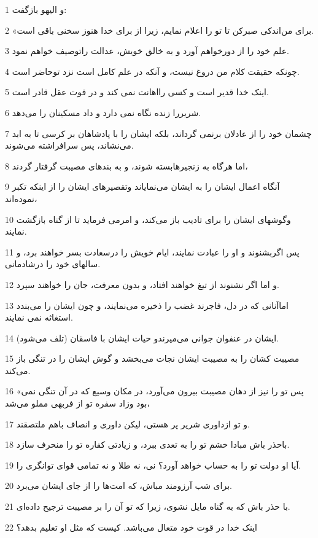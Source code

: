 \par 1 و الیهو باز‌گفت:
\par 2 «برای من‌اندکی صبرکن تا تو را اعلام نمایم، زیرا از برای خدا هنوز سخنی باقی است.
\par 3 علم خود را از دورخواهم آورد و به خالق خویش، عدالت راتوصیف خواهم نمود.
\par 4 چونکه حقیقت کلام من دروغ نیست، و آنکه در علم کامل است نزد توحاضر است.
\par 5 اینک خدا قدیر است و کسی رااهانت نمی کند و در قوت عقل قادر است.
\par 6 شریررا زنده نگاه نمی دارد و داد مسکینان را می‌دهد.
\par 7 چشمان خود را از عادلان برنمی گرداند، بلکه ایشان را با پادشاهان بر کرسی تا به ابد می‌نشاند، پس سرافراشته می‌شوند.
\par 8 اما هرگاه به زنجیرهابسته شوند، و به بندهای مصیبت گرفتار گردند،
\par 9 آنگاه اعمال ایشان را به ایشان می‌نمایاند وتقصیرهای ایشان را از اینکه تکبر نموده‌اند،
\par 10 وگوشهای ایشان را برای تادیب باز می‌کند، و امرمی فرماید تا از گناه بازگشت نمایند.
\par 11 پس اگربشنوند و او را عبادت نمایند، ایام خویش را درسعادت بسر خواهند برد، و سالهای خود را درشادمانی.
\par 12 و اما اگر نشنوند از تیغ خواهند افتاد، و بدون معرفت، جان را خواهند سپرد.
\par 13 اماآنانی که در دل، فاجرند غضب را ذخیره می‌نمایند، و چون ایشان را می‌بندد استغاثه نمی نمایند.
\par 14 ایشان در عنفوان جوانی می‌میرندو حیات ایشان با فاسقان (تلف می‌شود).
\par 15 مصیبت کشان را به مصیبت ایشان نجات می‌بخشد و گوش ایشان را در تنگی باز می‌کند.
\par 16 «پس تو را نیز از دهان مصیبت بیرون می‌آورد، در مکان وسیع که در آن تنگی نمی بود وزاد سفره تو از فربهی مملو می‌شد،
\par 17 و تو ازداوری شریر پر هستی، لیکن داوری و انصاف باهم ملتصقند.
\par 18 باحذر باش مبادا خشم تو را به تعدی ببرد، و زیادتی کفاره تو را منحرف سازد.
\par 19 آیا او دولت تو را به حساب خواهد آورد؟ نی، نه طلا و نه تمامی قوای توانگری را.
\par 20 برای شب آرزومند مباش، که امت‌ها را از جای ایشان می‌برد.
\par 21 با حذر باش که به گناه مایل نشوی، زیرا که تو آن را بر مصیبت ترجیح داده‌ای.
\par 22 اینک خدا در قوت خود متعال می‌باشد. کیست که مثل او تعلیم بدهد؟
